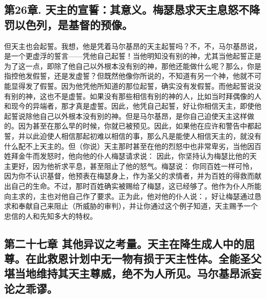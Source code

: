 
\subsection{第26章. 天主的宣誓：其意义。梅瑟恳求天主息怒不降罚以色列，是基督的预像。}

但天主也会起誓。我想，他是凭着马尔基昂的天主起誓吗？不，不，马尔基昂说，是一个更虚浮的誓言——凭他自己起誓！当他明知没有别的神，尤其当他起誓正是为了这一点，即除了他自己以外根本没有别的神，那他还能做什么呢？那么，你是指控他发假誓，还是发虚誓？但既然他像你所说的，不知道有另一个神，他就不可能显得发了假誓。因为他凭他所知道的那位起誓，确实没有发假誓。而他起誓说没有别的神，这也不是虚誓。如果没有那些相信有别的神的人，比如当时拜偶像的人和现今的异端者，那才真是虚誓。因此，他凭自己起誓，好让你相信天主，即使他起誓说除他自己以外根本没有别的神。但是马尔基昂，是你自己迫使天主这样做的。因为甚至在那么早的时候，你就已被预见。因此，如果他在应许和警告中都起誓，并以此迫使人相信那起初难以相信的事，那么凡是能使人相信天主的，就没有什么配不上天主的。但（你说）天主那时甚至在他的烈怒中也非常卑劣，当他因百姓拜金牛而发怒时，他向他的仆人梅瑟请求说： 因此，你坚持认为梅瑟比他的天主更好，因为他祈求平息，甚至阻止了他的怒气。梅瑟说： 你同百姓一样可怜，因为你不认识基督，他预表在梅瑟身上，作为圣父的求情者，并为百姓的得救而献出自己的生命。不过，那时百姓确实被赐给了梅瑟，这已经够了。他作为仆人所能向主求的，主也对他自己作了要求。正为此，他对他的仆人说：，好让梅瑟通过恳求和奉献自己来阻止（所威胁的审判），并让你通过这个例子知道，天主赐予一个忠信的人和先知多大的特权。\par


\subsection{第二十七章 其他异议之考量。天主在降生成人中的屈尊。在此救恩计划中无一物有损于天主性体。全能圣父堪当地维持其天主尊威，绝不为人所见。马尔基昂派妄论之乖谬。}

